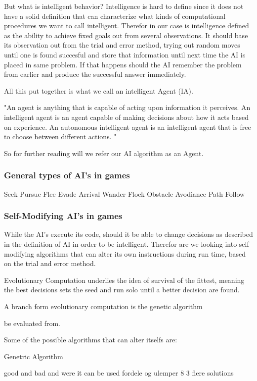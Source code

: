 But what is intelligent behavior? Intelligence is hard to define since it does not have a solid definition that can characterize what kinds of computational procedures we want to call intelligent.
Therefor in our case is intelligence defined as the ability to achieve fixed goals out from several observations.
It should base its observation out from the trial and error method, trying out random moves until one is found succesful and store that information until next time the AI is placed in same problem. If that happens should the AI remember the problem from earlier and produce the successful answer immediately.

All this put together is what we call an intelligent Agent (IA).

"An agent is anything that is capable of acting upon information it perceives. An intelligent agent is an agent capable of making decisions about how it acts based on experience. An autonomous intelligent agent is an intelligent agent that is free to choose between different actions. "

So for further reading will we refer our AI algorithm as an Agent.


\subsubsection{General types of AI's in games}

Seek
Pursue
Flee
Evade
Arrival
Wander
Flock
Obstacle Avodiance
Path Follow


\subsubsection{Self-Modifying AI's in games}

While the AI's execute its code, should it be able to change decisions as described in the definition of AI in order to be intelligent. Therefor are we looking into self-modifying algorithms that can alter its own instructions during run time, based on the trial and error method.

Evolutionary Computation underlies the idea of survival of the fittest, meaning the best decisions sets the seed and run solo until a better decision are found.


A branch form evolutionary computation is the genetic algorithm


be evaluated from.


Some of the possible algorithms that can alter itselfs are:

Genetric Algorithm



good and bad
and were it can be used
fordele og ulemper
8
3 flere solutions





 \cite{Gallagher2003}